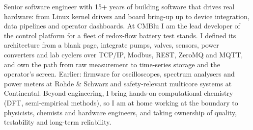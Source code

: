 

\begin{cvparagraph}
Senior software engineer with 15+ years of building software that drives real hardware: from Linux kernel drivers and board bring-up up to device integration, data pipelines and operator dashboards. At CMBlu I am the lead developer of the control platform for a fleet of redox-flow battery test stands. I defined its architecture from a blank page, integrate pumps, valves, sensors, power converters and lab cyclers over TCP/IP, Modbus, REST, ZeroMQ and MQTT, and own the path from raw measurement to time-series storage and the operator's screen. Earlier: firmware for oscilloscopes, spectrum analysers and power meters at Rohde \& Schwarz and safety-relevant multicore systems at Continental. Beyond engineering, I bring hands-on computational chemistry (DFT, semi-empirical methods), so I am at home working at the boundary to physicists, chemists and hardware engineers, and taking ownership of quality, testability and long-term reliability.
\end{cvparagraph}
